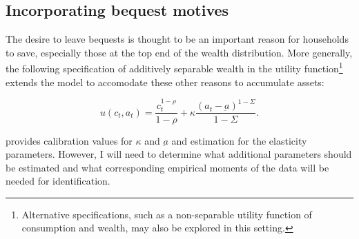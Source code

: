 \documentclass[\econtexRoot/Chp1proposal]{subfiles}
\begin{document}


\subsection{Incorporating bequest motives}

\par The desire to leave bequests is thought to be an important reason for households to save, especially those at the top end of the wealth distribution. More generally, the following specification of additively separable wealth in the utility function\footnote{Alternative specifications, such as a non-separable utility function of consumption and wealth, may also be explored in this setting.} extends the model to accomodate these other reasons to accumulate assets:

$$u(c_t, a_t) = \frac{c_{t}^{1-\rho}}{1-\rho} + \kappa \frac{(a_{t}-\underbar{a})^{1-\Sigma}}{1-\Sigma}.$$

\par \cite{ls2019} provides calibration values for $\kappa$ and $\underbar{a}$ and estimation for the elasticity parameters. However, I will need to determine what additional parameters should be estimated and what corresponding empirical moments of the data will be needed for identification.



\end{document}
